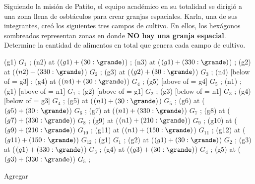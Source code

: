 \begin{probgrupal}{}{}{}
\noindent Siguiendo la misión de Patito, el equipo académico en su totalidad se dirigió a una zona llena de osbtáculos para crear granjas espaciales. 
Karla, una de sus integrantes, creó los siguientes tres campos de cultivo. En ellos, los hexágonos sombreados representan zonas en donde \textbf{NO hay %
una granja espacial}. Determine la cantidad de alimentos en total que genera cada campo de cultivo.

\begin{center}
\cultivos
\granja (g1) {$G_1$} ;
\granjaN (n2) at ($(g1) + (30:\grande)$) {} ;
\granjaN (n3) at ($(g1) + (330:\grande)$) {} ;
\granja (g2) at ($(n2) + (330:\grande)$) {$G_2$} ;
\granja (g3) at ($(g2) + (30:\grande)$) {$G_3$} ;
\granjaN (n4) [below of = g3] {} ;
\granja (g4) at ($(n4) + (30:\grande)$) {$G_4$} ;
\granja (g5) [above of = g4] {$G_5$} ;
\finfin
\hspace{20mm}
\cultivos
\granjaN (n1) {} ;
\granja (g1) [above of = n1] {$G_1$} ;
\granja (g2) [above of = g1] {$G_2$} ;
\granja (g3) [below of = n1] {$G_3$} ;
\granja (g4) [below of = g3] {$G_4$} ;
\granja (g5) at ($(n1) + (30:\grande)$) {$G_5$} ;
\granja (g6) at ($(g5) + (30:\grande)$) {$G_6$} ;
\granja (g7) at ($(n1) + (330:\grande)$) {$G_7$} ;
\granja (g8) at ($(g7) + (330:\grande)$) {$G_8$} ;
\granja (g9) at ($(n1) + (210:\grande)$) {$G_9$} ;
\granja (g10) at ($(g9) + (210:\grande)$) {$G_{10}$} ;
\granja (g11) at ($(n1) + (150:\grande)$) {$G_{11}$} ;
\granja (g12) at ($(g11) + (150:\grande)$) {$G_{12}$} ;
\finfin
\hspace{20mm}
\cultivos
\granja (g1) {$G_1$} ;
\granja (g2) at ($(g1) + (30:\grande)$) {$G_2$} ;
\granja (g3) at ($(g1) + (330:\grande)$) {$G_3$} ;
\granja (g4) at ($(g3) + (30:\grande)$) {$G_4$} ;
\granja (g5) at ($(g3) + (330:\grande)$) {$G_5$} ;
\finfin
\end{center}

\end{probgrupal}

\begin{solgrupal}
Agregar
\end{solgrupal}


